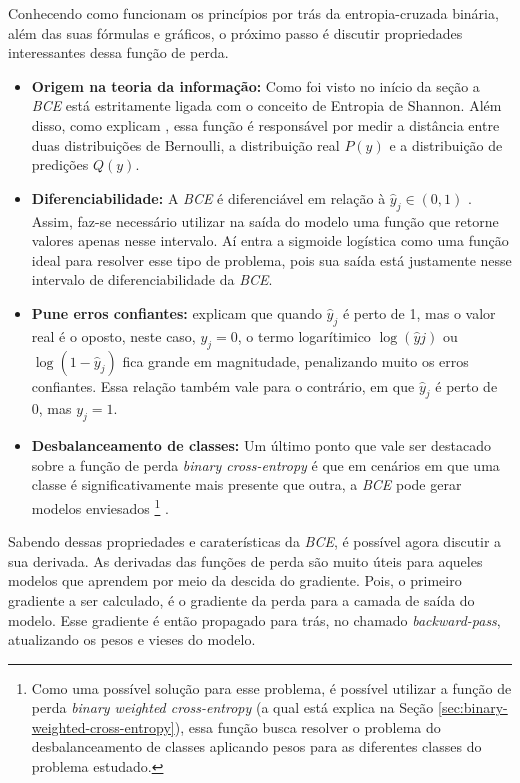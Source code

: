 Conhecendo como funcionam os princípios por trás da entropia-cruzada binária, além das suas fórmulas e gráficos, o próximo passo é discutir propriedades interessantes dessa função de perda. 

\begin{itemize}
    \item \textbf{Origem na teoria da informação:} Como foi visto no início da seção a \textit{BCE} está estritamente ligada com o conceito de Entropia de Shannon. Além disso, como explicam \textcite{LossesArticle}, essa função é responsável por medir a distância entre duas distribuições de Bernoulli, a distribuição real $P(y)$ e a distribuição de predições $Q(y)$.
    \item \textbf{Diferenciabilidade:} A \textit{BCE} é diferenciável em relação à $\hat{y}_j \in (0,1)$ \parencite{LossesArticle}. Assim, faz-se necessário utilizar na saída do modelo uma função que retorne valores apenas nesse intervalo. Aí entra a sigmoide logística como uma função ideal para resolver esse tipo de problema, pois sua saída está justamente nesse intervalo de diferenciabilidade da \textit{BCE}. 
    \item \textbf{Pune erros confiantes:} \textcite{LossesArticle} explicam que quando $\hat{y}_j$ é perto de 1, mas o valor real é o oposto, neste caso, $y_j = 0$, o termo logarítimico $\log(\hat{y}j)$ ou $\log(1 - \hat{y}_j)$ fica grande em magnitudade, penalizando muito os erros confiantes. Essa relação também vale para o contrário, em que $\hat{y}_j$ é perto de 0, mas $y_j = 1$.
    \item \textbf{Desbalanceamento de classes:} Um último ponto que vale ser destacado sobre a função de perda \textit{binary cross-entropy} é que em cenários em que uma classe é significativamente mais presente que outra, a \textit{BCE} pode gerar modelos enviesados \footnote{Como uma possível solução para esse problema, é possível utilizar a função de perda \textit{binary weighted cross-entropy} (a qual está explica na Seção \ref{sec:binary-weighted-cross-entropy}), essa função busca resolver o problema do desbalanceamento de classes aplicando pesos para as diferentes classes do problema estudado.} \parencite{LossesArticle}.
\end{itemize}

Sabendo dessas propriedades e caraterísticas da \textit{BCE}, é possível agora discutir a sua derivada. As derivadas das funções de perda são muito úteis para aqueles modelos que aprendem por meio da descida do gradiente. Pois, o primeiro gradiente a ser calculado, é o gradiente da perda para a camada de saída do modelo. Esse gradiente é então propagado para trás, no chamado \textit{backward-pass}, atualizando os pesos e vieses do modelo.

